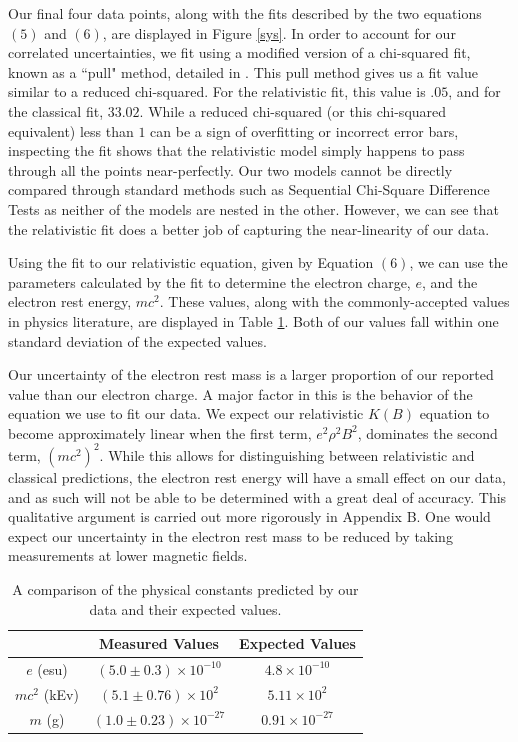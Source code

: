 Our final four data points, along with the fits described by the two equations $(5)$ and $(6)$, are displayed in Figure \ref{sys}. In order to account for our correlated uncertainties, we fit using a modified version of a chi-squared fit, known as a ``pull" method, detailed in \cite{sys}. This pull method gives us a fit value similar to a reduced chi-squared. For the relativistic fit, this value is $.05$, and for the classical fit, $33.02$. While a reduced chi-squared (or this chi-squared equivalent) less than $1$ can be a sign of overfitting or incorrect error bars, inspecting the fit shows that the relativistic model simply happens to pass through all the points near-perfectly. Our two models cannot be directly compared through standard methods such as Sequential Chi-Square Difference Tests \cite{diff} as neither of the models are nested in the other. However, we can see that the relativistic fit does a better job of capturing the near-linearity of our data.

Using the fit to our relativistic equation, given by Equation $(6)$, we can use the parameters calculated by the fit to determine the electron charge, $e$, and the electron rest energy, $mc^2$. These values, along with the commonly-accepted values in physics literature, are displayed in Table \ref{data}. Both of our values fall within one standard deviation of the expected values.

Our uncertainty of the electron rest mass is a larger proportion of our reported value than our electron charge. A major factor in this is the behavior of the equation we use to fit our data. We expect our relativistic $K(B)$ equation to become approximately linear when the first term, $e^2 \rho^2 B^2$, dominates the second term, $(mc^2)^2$. While this allows for distinguishing between relativistic and classical predictions, the electron rest energy will have a small effect on our data, and as such will not be able to be determined with a great deal of accuracy. This qualitative argument is carried out more rigorously in Appendix B. One would expect our uncertainty in the electron rest mass to be reduced by taking measurements at lower magnetic fields.
\begin{table}[h]
  \begin{ruledtabular}
    \begin{tabular}{ccc}
      &  Measured Values & Expected Values \\
      \hline
      $e$ (esu) & $(5.0 \pm 0.3) \times 10^{-10}$ & $4.8 \times 10^{-10}$ \\
      $mc^2$ (kEv) & $(5.1 \pm 0.76) \times 10^2$ & $5.11 \times 10^2$ \\
      $m$ (g) & $(1.0 \pm 0.23) \times 10^{-27}$ & $0.91 \times 10^{-27}$ \\
    \end{tabular}
  \end{ruledtabular}
  \caption{A comparison of the physical constants predicted by our data and their expected values.}
  \label{data}
\end{table}


